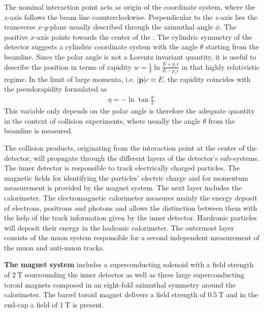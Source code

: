 %
The nominal interaction point acts as origin of the coordinate system, where the $z$-axis follows the beam line counterclockwise. Perpendicular to the $z$-axis lies the transverse $x$-$y$-plane usually described through the azimuthal angle $\phi$. The positive $x$-axis points towards the center of the {\LHC}. The cylindric symmetry of the detector suggests a cylindric coordinate system with the angle $\theta$ starting from the beamline. \cite{ATLASJINST} Since the polar angle is not a Lorentz invariant quantity, it is useful to describe the position in terms of rapidity \cite{LHCJINST} $w=\frac12\ln{\frac{E+p_zc}{E-p_zc}}$ in that highly relativistic regime. In the limit of large momenta, i.e. $|\mathbf{p}|c\approx E$, the rapidity coincides with the pseudorapidity formulated as \cite{ChinaPseudorapidityBook}
\begin{align}
                        \eta=-\ln{\tan\frac{\theta}{2}}\text{.}
\label{pseudorapidity}
\end{align}
This variable only depends on the polar angle is therefore the adequate quantity in the context of collision experiments, where usually the angle $\theta$ from the beamline is measured. \cite{ChinaPseudorapidityBook}\par
The collision products, originating from the interaction point at the center of the {\ATLAS} detector, will propagate through the different layers of the detector's sub-systems. The inner detector is responsible to track electrically charged particles. The magnetic fields for identifying the particles' electric charge and for momentum measurement is provided by the {\ATLAS} magnet system. The next layer includes the calorimeter. The electromagnetic calorimeter measures mainly the energy deposit of electrons, positrons and photons and allows the distinction between them with the help of the track information given by the inner detector. Hardronic particles will deposit their energy in the hadronic calorimeter. The outermost layer consists of the muon system responsible for a second independent measurement of the muon and anti-muon tracks. \cite{ATLASJINST}\par    
\textbf{The magnet system} includes a superconducting solenoid with a field strength of $\SI{2}{\tesla}$ sourrounding the inner detector as well as three large superconducting toroid magnets composed in an eight-fold azimuthal symmetry around the calorimeter. The barrel toroid magnet delivers a field strength of $\SI{0.5}{\tesla}$ and in the end-cap a field of $\SI{1}{\tesla}$ is present. \cite{ATLASJINST}\newline%
